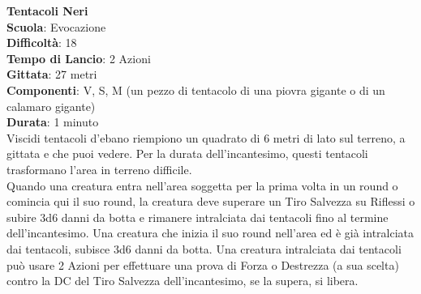 \begin{multicols}{2}
\medskip\textbf{Tentacoli Neri}\\
\textbf{Scuola}: Evocazione\\
\textbf{Difficoltà}:  18\\
\textbf{Tempo di Lancio}: 2 Azioni\\
\textbf{Gittata}: 27 metri\\
\textbf{Componenti}: V, S, M (un pezzo di tentacolo di una piovra gigante o di un calamaro gigante)\\
\textbf{Durata}: 1 minuto\\
Viscidi tentacoli d’ebano riempiono un quadrato di 6 metri di lato sul terreno, a gittata e che puoi vedere. Per la durata dell'incantesimo, questi tentacoli trasformano l’area in terreno difficile.\\
Quando una creatura entra nell'area soggetta per la prima volta in un round o comincia qui il suo round, la creatura deve superare un Tiro Salvezza su Riflessi o subire 3d6 danni da botta e rimanere intralciata dai tentacoli fino al termine dell'incantesimo. Una creatura che inizia il suo round nell'area ed è già intralciata dai tentacoli, subisce 3d6 danni da botta. Una creatura intralciata dai tentacoli può usare 2 Azioni per effettuare una prova di Forza o Destrezza (a sua scelta) contro la DC del Tiro Salvezza dell'incantesimo, se la supera, si libera.


\end{multicols}
